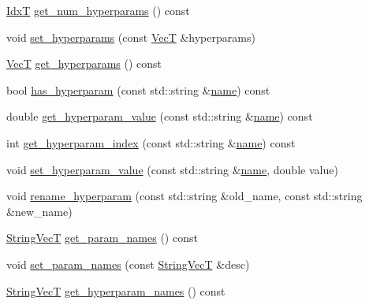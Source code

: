 \begin{DoxyCompactItemize}
\item 
\hyperlink{namespacemappel_ab17ec0f30b61ece292439d7ece81d3a8}{IdxT} \hyperlink{classmappel_1_1PointEmitterModel_a442522cdaaa76be15b00a4f25110d7ec}{get\+\_\+num\+\_\+hyperparams} () const 
\item 
void \hyperlink{classmappel_1_1PointEmitterModel_ac603a33d83a32f5e4dd826399521a28b}{set\+\_\+hyperparams} (const \hyperlink{namespacemappel_a2225ad69f358daa3f4f99282a35b9a3a}{VecT} \&hyperparams)
\item 
\hyperlink{namespacemappel_a2225ad69f358daa3f4f99282a35b9a3a}{VecT} \hyperlink{classmappel_1_1PointEmitterModel_a4085ade54f4b039c647bc9bf7804e007}{get\+\_\+hyperparams} () const 
\item 
bool \hyperlink{classmappel_1_1PointEmitterModel_afba2b17a81a506b0acd41616c8604412}{has\+\_\+hyperparam} (const std\+::string \&\hyperlink{classmappel_1_1Gauss2DsxyMAP_a4e786341079a9399fd30a8184eac2d5c}{name}) const 
\item 
double \hyperlink{classmappel_1_1PointEmitterModel_a3282cc59d5c6010a51f671ba72997705}{get\+\_\+hyperparam\+\_\+value} (const std\+::string \&\hyperlink{classmappel_1_1Gauss2DsxyMAP_a4e786341079a9399fd30a8184eac2d5c}{name}) const 
\item 
int \hyperlink{classmappel_1_1PointEmitterModel_ae13aa99689266d870b659d1045d595f1}{get\+\_\+hyperparam\+\_\+index} (const std\+::string \&\hyperlink{classmappel_1_1Gauss2DsxyMAP_a4e786341079a9399fd30a8184eac2d5c}{name}) const 
\item 
void \hyperlink{classmappel_1_1PointEmitterModel_ade3e56cc00c43e9b7a521d8c4778d3b7}{set\+\_\+hyperparam\+\_\+value} (const std\+::string \&\hyperlink{classmappel_1_1Gauss2DsxyMAP_a4e786341079a9399fd30a8184eac2d5c}{name}, double value)
\item 
void \hyperlink{classmappel_1_1PointEmitterModel_a447c83f0769e6dea2bfad68d957287d0}{rename\+\_\+hyperparam} (const std\+::string \&old\+\_\+name, const std\+::string \&new\+\_\+name)
\item 
\hyperlink{namespacemappel_aae88cf18bccfbb789a6019bcfbbfca68}{String\+VecT} \hyperlink{classmappel_1_1PointEmitterModel_aa910d1137d808041c0601f2dd3db96f0}{get\+\_\+param\+\_\+names} () const 
\item 
void \hyperlink{classmappel_1_1PointEmitterModel_a2abccbca47fc60700d73244e6c4dbe30}{set\+\_\+param\+\_\+names} (const \hyperlink{namespacemappel_aae88cf18bccfbb789a6019bcfbbfca68}{String\+VecT} \&desc)
\item 
\hyperlink{namespacemappel_aae88cf18bccfbb789a6019bcfbbfca68}{String\+VecT} \hyperlink{classmappel_1_1PointEmitterModel_a1b8bbd4bdddfb8f5236e8e50fe546c36}{get\+\_\+hyperparam\+\_\+names} () const 

\end{DoxyCompactItemize}
